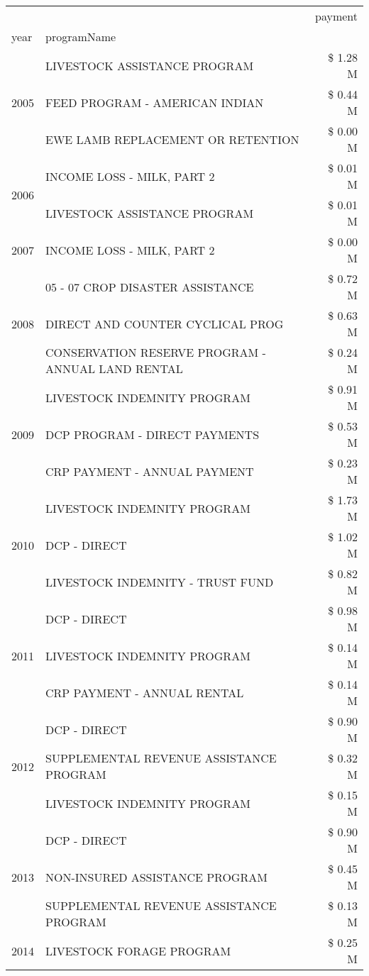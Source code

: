 \begin{tabular}{llr}
\toprule
 &  & payment \\
year & programName &  \\
\midrule
\multirow[t]{3}{*}{2005} & LIVESTOCK ASSISTANCE PROGRAM & \$ 1.28 M \\
 & FEED PROGRAM - AMERICAN INDIAN & \$ 0.44 M \\
 & EWE LAMB REPLACEMENT OR RETENTION & \$ 0.00 M \\
\cline{1-3}
\multirow[t]{2}{*}{2006} & INCOME LOSS - MILK, PART 2 & \$ 0.01 M \\
 & LIVESTOCK ASSISTANCE PROGRAM & \$ 0.01 M \\
\cline{1-3}
2007 & INCOME LOSS - MILK, PART 2 & \$ 0.00 M \\
\cline{1-3}
\multirow[t]{3}{*}{2008} & 05 - 07 CROP DISASTER ASSISTANCE & \$ 0.72 M \\
 & DIRECT AND COUNTER CYCLICAL PROG & \$ 0.63 M \\
 & CONSERVATION RESERVE PROGRAM - ANNUAL LAND RENTAL & \$ 0.24 M \\
\cline{1-3}
\multirow[t]{3}{*}{2009} & LIVESTOCK INDEMNITY PROGRAM & \$ 0.91 M \\
 & DCP PROGRAM - DIRECT PAYMENTS & \$ 0.53 M \\
 & CRP PAYMENT - ANNUAL PAYMENT & \$ 0.23 M \\
\cline{1-3}
\multirow[t]{3}{*}{2010} & LIVESTOCK INDEMNITY PROGRAM & \$ 1.73 M \\
 & DCP - DIRECT & \$ 1.02 M \\
 & LIVESTOCK INDEMNITY - TRUST FUND & \$ 0.82 M \\
\cline{1-3}
\multirow[t]{3}{*}{2011} & DCP - DIRECT & \$ 0.98 M \\
 & LIVESTOCK INDEMNITY PROGRAM & \$ 0.14 M \\
 & CRP PAYMENT - ANNUAL RENTAL & \$ 0.14 M \\
\cline{1-3}
\multirow[t]{3}{*}{2012} & DCP - DIRECT & \$ 0.90 M \\
 & SUPPLEMENTAL REVENUE ASSISTANCE PROGRAM & \$ 0.32 M \\
 & LIVESTOCK INDEMNITY PROGRAM & \$ 0.15 M \\
\cline{1-3}
\multirow[t]{3}{*}{2013} & DCP - DIRECT & \$ 0.90 M \\
 & NON-INSURED ASSISTANCE PROGRAM & \$ 0.45 M \\
 & SUPPLEMENTAL REVENUE ASSISTANCE PROGRAM & \$ 0.13 M \\
\cline{1-3}
\multirow[t]{3}{*}{2014} & LIVESTOCK FORAGE PROGRAM & \$ 0.25 M \\

\end{tabular}
